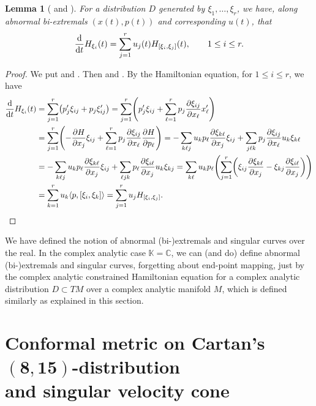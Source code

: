 \documentclass[pdftex]{sigma}
\numberwithin{equation}{section}
\newtheorem{Lemma}[Theorem]{Lemma}
\theoremstyle{definition}
\newcommand{\C}{\mathbb{C}}
\newcommand{\KK}{\mathbb{K}}
\newcommand{\0}{\boldsymbol{0}}
\newcommand{\pa}{\partial}
\begin{document}
\begin{Lemma}[{\cite{AS}} and {\cite[Section~4.2]{BC}}]
\label{Singular-curve-lemma} For a distribution $D$ generated by $\xi_1, \dots, \xi_r$,
we have, along abnormal bi-extremals $(x(t), p(t))$ and corresponding $u(t)$, that
\[
\frac{{\rm d}}{{\rm d}t}H_{\xi_i}(t) = \sum_{j=1}^r u_j(t) H_{[\xi_i, \xi_j]}(t), \qquad 1 \leq i \leq r.
\]
\end{Lemma}
\begin{proof}
We put  and \smash{$\xi_i = \sum_{k=1}^r \xi_{ik}\frac{\pa}{\pa x_k}$}.
Then  and .
By the Hamiltonian equation, for $1 \leq i \leq r$, we have
\begin{align*}
\frac{{\rm d}}{{\rm d}t}H_{\xi_i}(t) & = \sum_{j=1}^r \bigl(p_j'\xi_{ij} + p_j\xi_{ij}'\bigr) =
\sum_{j=1}^r \Biggl(p_j'\xi_{ij} + \sum_{\ell =1}^r p_j\frac{\pa \xi_{ij}}{\pa x_\ell}x_{\ell}'\Biggr)
\\
& = \sum_{j=1}^r \Biggl(- \frac{\pa H}{\pa x_j}\xi_{ij}
+ \sum_{\ell =1}^r p_j\frac{\pa \xi_{ij}}{\pa x_\ell}\frac{\pa H}{\pa p_\ell}\Biggr)
 = - \sum_{k\ell j} u_kp_\ell \frac{\pa \xi_{k\ell}}{\pa x_j}\xi_{ij}
+ \sum_{j\ell k} p_j\frac{\pa \xi_{ij}}{\pa x_\ell}u_k\xi_{k\ell}
\\
& =
 - \sum_{k\ell j} u_kp_\ell \frac{\pa \xi_{k\ell}}{\pa x_j}\xi_{ij}
+ \sum_{\ell j k} p_\ell\frac{\pa \xi_{i\ell}}{\pa x_j}u_k\xi_{kj}
=
\sum_{k\ell} u_kp_\ell\Biggl(
\sum_{j=1}^r\biggl(
\xi_{ij}\frac{\pa \xi_{k\ell}}{\pa x_j} - \xi_{kj}\frac{\pa \xi_{i\ell}}{\pa x_j}
\biggr)
\Biggr)
\\
& = \sum_{k=1}^r u_k\langle p, [\xi_i, \xi_k]\rangle = \sum_{j=1}^r u_jH_{[\xi_i, \xi_j]}.
\tag*{\qed}
\end{align*}
\renewcommand{\qed}{}
\end{proof}

\begin{Remark}
We have defined the notion of abnormal (bi-)extremals and singular curves over the real.
In the complex analytic case $\KK = \C$, we can (and do) define abnormal (bi-)extremals and singular curves, forgetting
about end-point mapping,
just by the complex analytic constrained Hamiltonian equation for a complex analytic distribution $D \subset TM$
over a complex analytic manifold $M$, which is defined similarly as explained in this section.
\end{Remark}


\section[Conformal metric on Cartan's (8, 15)-distribution and singular velocity cone]{Conformal metric on Cartan's $\boldsymbol{(8, 15)}$-distribution\\ and singular velocity cone}
\label{Singular-velocity}
\end{document}
